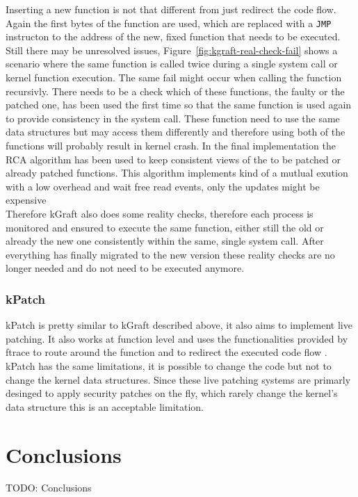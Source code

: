 \documentclass{sig-alternate-05-2015}
\begin{document}
Inserting a new function is not that different from just redirect the code flow. Again the first bytes of the function are used, which are replaced with a \texttt{JMP} instructon to the address of the new, fixed function that needs to be executed. \\ Still there may be unresolved issues, Figure~\ref{fig:kgraft-real-check-fail} shows a scenario where the same function is called twice during a single system call or kernel function execution. The same fail might occur when calling the function recursivly. There needs to be a check which of these functions, the faulty or the patched one, has been used the first time so that the same function is used again to provide consistency in the system call. These function need to use the same data structures but may access them differently and therefore using both of the functions will probably result in kernel crash. In the final implementation the RCA algorithm has been used to keep consistent views of the to be patched or already patched functions. This algorithm implements kind of a mutlual exution with a low overhead and wait free read events, only the updates might be expensive  \\
Therefore kGraft also does some reality checks, therefore each process is monitored and ensured to execute the same function, either still the old or already the new one consistently within the same, single system call. After everything has finally migrated to the new version these reality checks are no longer needed and do not need to be executed anymore. 

\subsubsection{kPatch}
kPatch is pretty similar to kGraft described above, it also aims to implement live patching. It also works at function level and uses the functionalities provided by ftrace to route around the function and to redirect the executed code flow \cite{kpatch}. kPatch has the same limitations, it is possible to change the code but not to change the kernel data structures. Since these live patching systems are primarly desinged to apply security patches on the fly, which rarely change the kernel's data structure this is an acceptable limitation.



\section{Conclusions}

TODO: Conclusions





\balancecolumns{}
\end{document}
